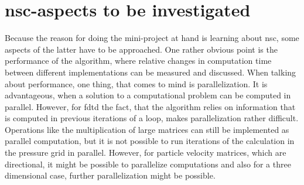 \section{\gls{nsc}-aspects to be investigated}
Because the reason for doing the mini-project at hand is learning about \gls{nsc}, some aspects of the latter have to be approached. One rather obvious point is the performance of the algorithm, where relative changes in computation time between different implementations can be measured and discussed. When talking about performance, one thing, that comes to mind is parallelization. It is advantageous, when a solution to a computational problem can be computed in parallel. However, for \gls{fdtd} the fact, that the algorithm relies on information that is computed in previous iterations of a loop, makes parallelization rather difficult. Operations like the multiplication of large matrices can still be implemented as parallel computation, but it is not possible to run iterations of the calculation in the pressure grid in parallel. However, for particle velocity matrices, which are directional, it might be possible to parallelize computations and also for a three dimensional case, further parallelization might be possible.